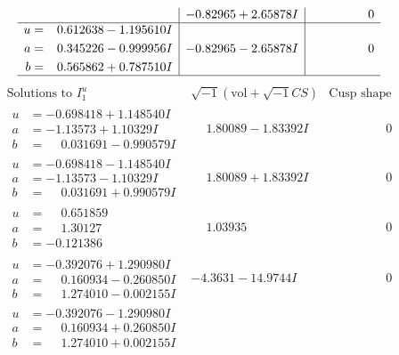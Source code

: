 \documentclass[1p]{elsarticle_modified}
\theoremstyle{definition}
\newcommand{\I}{\sqrt{-1}}
\begin{document}
$$\begin{array}{c|c|c}
 & -0.82965 + 2.65878 I & \phantom{-0.000000 } 0 \\ \hline\begin{aligned}
u &= \phantom{-}0.612638 - 1.195610 I \\
a &= \phantom{-}0.345226 - 0.999956 I \\
b &= \phantom{-}0.565862 + 0.787510 I\end{aligned}
 & -0.82965 - 2.65878 I & \phantom{-0.000000 } 0\\
 \hline 
 \end{array}$$\newpage$$\begin{array}{c|c|c}  
\text{Solutions to }I^u_{1}& \I (\text{vol} + \sqrt{-1}CS) & \text{Cusp shape}\\
 \hline 
\begin{aligned}
u &= -0.698418 + 1.148540 I \\
a &= -1.13573 + 1.10329 I \\
b &= \phantom{-}0.031691 - 0.990579 I\end{aligned}
 & \phantom{-}1.80089 - 1.83392 I & \phantom{-0.000000 } 0 \\ \hline\begin{aligned}
u &= -0.698418 - 1.148540 I \\
a &= -1.13573 - 1.10329 I \\
b &= \phantom{-}0.031691 + 0.990579 I\end{aligned}
 & \phantom{-}1.80089 + 1.83392 I & \phantom{-0.000000 } 0 \\ \hline\begin{aligned}
u &= \phantom{-}0.651859\phantom{ +0.000000I} \\
a &= \phantom{-}1.30127\phantom{ +0.000000I} \\
b &= -0.121386\phantom{ +0.000000I}\end{aligned}
 & \phantom{-}1.03935\phantom{ +0.000000I} & \phantom{-0.000000 } 0 \\ \hline\begin{aligned}
u &= -0.392076 + 1.290980 I \\
a &= \phantom{-}0.160934 - 0.260850 I \\
b &= \phantom{-}1.274010 - 0.002155 I\end{aligned}
 & -4.3631 - 14.9744 I & \phantom{-0.000000 } 0 \\ \hline\begin{aligned}
u &= -0.392076 - 1.290980 I \\
a &= \phantom{-}0.160934 + 0.260850 I \\
b &= \phantom{-}1.274010 + 0.002155 I\end{aligned}

\end{array}$$
\end{document}
